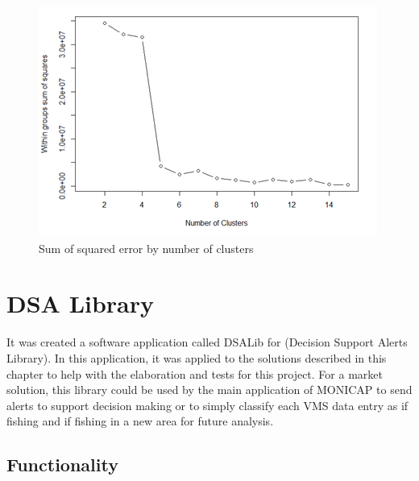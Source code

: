 \begin{figure}[H]
    \centering
    \includegraphics[width=0.8\linewidth]{Chapters/img/elbow_method.png}
    \caption{Sum of squared error by number of clusters}
    \label{fig:elbow_method}
\end{figure}






\section{DSA Library} %
\label{sub:dsa_library}


It was created a software application called DSALib for (Decision Support Alerts Library). In this application, it was applied to the solutions described in this chapter to help with the elaboration and tests for this project. For a market solution, this library could be used by the main application of MONICAP to send alerts to support decision making or to simply classify each VMS data entry as if fishing and if fishing in a new area for future analysis.

\newpage


\subsection{Functionality} %
\label{sub:functionality}


